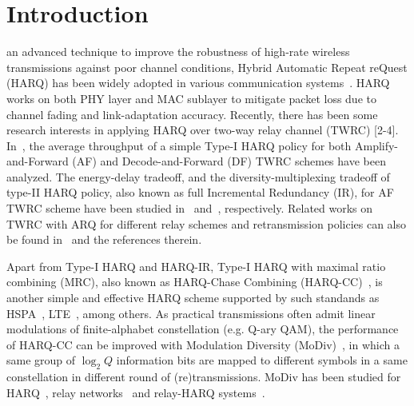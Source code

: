 \documentclass[journal]{IEEEtran}
\begin{document}
\section{Introduction}
\label{sec:intro}

 an advanced technique to improve the robustness of high-rate wireless
transmissions against poor channel conditions, Hybrid Automatic Repeat reQuest
(HARQ) has been widely adopted in various communication
systems~\cite{cripriano2010overview}. HARQ works on both PHY layer and MAC
sublayer to mitigate packet loss due to channel fading and
link-adaptation accuracy. Recently, there has been some research interests in
applying HARQ over two-way relay channel (TWRC) [2-4].
In~\cite{iannello2009throughput}, the average throughput of a simple Type-I HARQ
policy for both Amplify-and-Forward (AF) and Decode-and-Forward (DF) TWRC
schemes have been analyzed. The energy-delay tradeoff, and the diversity-multiplexing
tradeoff of type-II HARQ policy, also known as full Incremental Redundancy (IR),
for AF TWRC scheme have been studied in~\cite{choi2013energy}
and~\cite{xu2014diversity}, respectively. Related works on TWRC with ARQ
for different relay schemes and retransmission policies can also be
found in~\cite{popovski2007wireless, chen2012arq, guan2015twoway} and the references therein.

Apart from Type-I HARQ and HARQ-IR, Type-I HARQ with maximal ratio
combining (MRC), also known as HARQ-Chase Combining
(HARQ-CC)~\cite{chase1985code}, is another simple and effective HARQ
scheme supported by such standands as HSPA~\cite{TS25.308},
LTE~\cite{sesia2009lte}, among others. As practical transmissions often admit
linear modulations of finite-alphabet constellation (e.g. Q-ary QAM), the
performance of HARQ-CC can be improved with Modulation Diversity
(MoDiv)~\cite{benelli1992new}, in which a same group of $\log_2Q$
information bits are mapped to different symbols in a same constellation in
different round of (re)transmissions. MoDiv has been studied for
HARQ~\cite{harvind2005symbol}, relay
networks~\cite{seddik2008trans, khormuji2008rate} and relay-HARQ
systems~\cite{kim2009design, ryu2011ber}.
\end{document}
